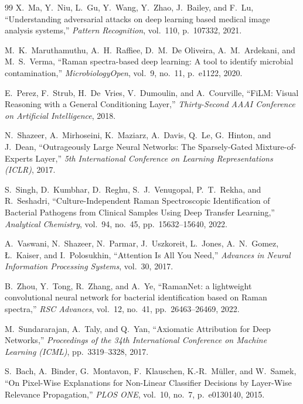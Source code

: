 \documentclass[preprint,12pt]{elsarticle}
\begin{document}
\begin{thebibliography}{99}
X.~Ma, Y.~Niu, L.~Gu, Y.~Wang, Y.~Zhao, J.~Bailey, and F.~Lu,
``Understanding adversarial attacks on deep learning based medical
image analysis systems,'' \textit{Pattern Recognition}, vol.~110,
p.~107332, 2021.

M.~K.~Maruthamuthu, A.~H.~Raffiee, D.~M.~De Oliveira, A.~M.~Ardekani,
and M.~S.~Verma, ``Raman spectra-based deep learning: A tool to
identify microbial contamination,'' \textit{MicrobiologyOpen}, vol.~9,
no.~11, p.~e1122, 2020.

E.~Perez, F.~Strub, H.~De~Vries, V.~Dumoulin, and A.~Courville,
``FiLM: Visual Reasoning with a General Conditioning Layer,''
\textit{Thirty-Second AAAI Conference on Artificial Intelligence},
2018.

N.~Shazeer, A.~Mirhoseini, K.~Maziarz, A.~Davis, Q.~Le, G.~Hinton,
and J.~Dean, ``Outrageously Large Neural Networks: The Sparsely-Gated
Mixture-of-Experts Layer,'' \textit{5th International Conference on
Learning Representations (ICLR)}, 2017.

S.~Singh, D.~Kumbhar, D.~Reghu, S.~J.~Venugopal, P.~T.~Rekha, and
R.~Seshadri, ``Culture-Independent Raman Spectroscopic Identification
of Bacterial Pathogens from Clinical Samples Using Deep Transfer
Learning,'' \textit{Analytical Chemistry}, vol.~94, no.~45,
pp.~15632--15640, 2022.

A.~Vaswani, N.~Shazeer, N.~Parmar, J.~Uszkoreit, L.~Jones,
A.~N.~Gomez, \L{}.~Kaiser, and I.~Polosukhin, ``Attention Is All You
Need,'' \textit{Advances in Neural Information Processing Systems},
vol.~30, 2017.

B.~Zhou, Y.~Tong, R.~Zhang, and A.~Ye, ``RamanNet: a lightweight
convolutional neural network for bacterial identification based on
Raman spectra,'' \textit{RSC Advances}, vol.~12, no.~41,
pp.~26463--26469, 2022.

M.~Sundararajan, A.~Taly, and Q.~Yan, ``Axiomatic Attribution for Deep Networks,'' \textit{Proceedings of the 34th International Conference on Machine Learning (ICML)}, pp.~3319--3328, 2017.

S.~Bach, A.~Binder, G.~Montavon, F.~Klauschen, K.-R.~M{\"{u}}ller, and W.~Samek, ``On Pixel-Wise Explanations for Non-Linear Classifier Decisions by Layer-Wise Relevance Propagation,'' \textit{PLOS ONE}, vol.~10, no.~7, p.~e0130140, 2015.


\end{thebibliography}
\end{document}
